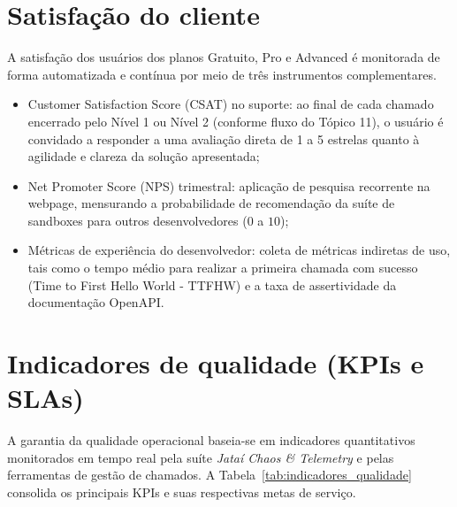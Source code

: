\documentclass[
  12pt,
  openright,
  oneside,
  a4paper,
  brazilian
]{abntex2}
\begin{document}
\section{Satisfação do cliente}
\label{sec:mensuracao_satisfacao}

A satisfação dos usuários dos planos Gratuito, Pro e Advanced é monitorada de forma automatizada e contínua por meio de três instrumentos complementares.

\begin{itemize}
    \item{Customer Satisfaction Score (CSAT) no suporte:} ao final de cada chamado encerrado pelo Nível 1 ou Nível 2 (conforme fluxo do Tópico 11), o usuário é convidado a responder a uma avaliação direta de 1 a 5 estrelas quanto à agilidade e clareza da solução apresentada;
    \item{Net Promoter Score (NPS) trimestral:} aplicação de pesquisa recorrente na webpage, mensurando a probabilidade de recomendação da suíte de sandboxes para outros desenvolvedores ($0$ a $10$);
    \item{Métricas de experiência do desenvolvedor:} coleta de métricas indiretas de uso, tais como o tempo médio para realizar a primeira chamada com sucesso (Time to First Hello World - TTFHW) e a taxa de assertividade da documentação OpenAPI.
\end{itemize}

\section{Indicadores de qualidade (KPIs e SLAs)}
\label{sec:indicadores_qualidade}

A garantia da qualidade operacional baseia-se em indicadores quantitativos monitorados em tempo real pela suíte \textit{Jataí Chaos \& Telemetry} e pelas ferramentas de gestão de chamados. A Tabela~\ref{tab:indicadores_qualidade} consolida os principais KPIs e suas respectivas metas de serviço.
\end{document}
